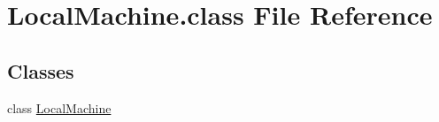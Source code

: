 \hypertarget{LocalMachine_8class}{\section{Local\-Machine.\-class File Reference}
\label{LocalMachine_8class}
}
\subsection*{Classes}
\begin{DoxyCompactItemize}
\item 
class \hyperlink{classLocalMachine}{Local\-Machine}
\end{DoxyCompactItemize}
